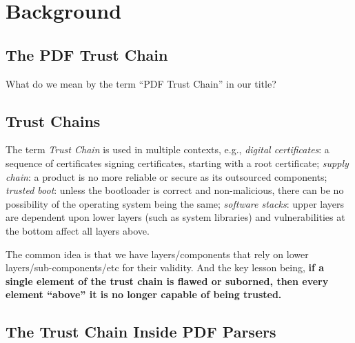 \section{Background}
\label{sec:background}

\subsection{The PDF Trust Chain }
\label{sec:trust-chain}

What do we mean by the term ``PDF Trust Chain'' in our title?

\subsection{Trust Chains}

The term \emph{Trust Chain} is used in multiple contexts, e.g.,
\emph{digital certificates}: a sequence of certificates signing certificates,
starting with a root certificate;
\emph{supply chain}: a product is no more reliable or secure as its
outsourced components;
\emph{trusted boot}: unless the bootloader is correct and non-malicious,
there can be no possibility of the operating system being the same;
\emph{software stacks}: upper layers are dependent upon lower layers (such as
system libraries) and vulnerabilities at the bottom affect all layers above.

The common idea is that we have layers/components that rely on lower
layers/sub-components/etc for their validity.
And the key lesson being,
{\bf{if a single element of the trust chain 
  is flawed or suborned, then every element ``above'' it
  is no longer capable of being trusted.}}


\subsection{The Trust Chain Inside PDF Parsers}


